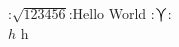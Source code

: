 \documentclass[a4paper]{article}
\begin{document}
:$\sqrt{123456}$:Hello World :$\bigcurlyvee$:\\

$h$ h
\end{document}
